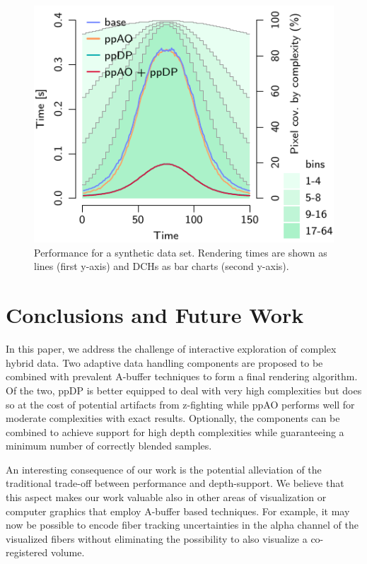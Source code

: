 \documentclass{egpubl}
\newcommand{\ab}{\mbox{A-buffer}}
\newcommand{\dch}{DCH}
\newcommand{\stencil}{ppAO}
\newcommand{\dloop}{ppDP}
\begin{document}
\begin{figure}[t]
\begin{minipage}{0.9\linewidth}
\begin{minipage}{1.0\linewidth}
    \includegraphics[width=\linewidth]{figures/plot-viewdep-quad-tall} 
  \end{minipage}
  \end{minipage}
  \caption{\label{fig:viewdep-quad}%
    Performance for a synthetic data set.
    Rendering times are shown as lines (first y-axis) and \dch{}s as bar charts (second y-axis). 
  }
\end{figure}


\section{Conclusions and Future Work}
\label{sec:conclusion}


In this paper, we address the challenge of interactive exploration of complex hybrid data. 
Two adaptive data handling components are proposed to be combined with prevalent \ab{} techniques to form a final rendering algorithm. 
Of the two, \dloop{} is better equipped to deal with very high complexities but does so at the cost of potential artifacts from z-fighting while \stencil{} performs well for moderate complexities with exact results. 
Optionally, the components can be combined to achieve support for high depth complexities while guaranteeing a minimum number of correctly blended samples. 

An interesting consequence of our work is the potential alleviation of the traditional trade-off between performance and depth-support. 
We believe that this aspect makes our work valuable also in other areas of visualization or computer graphics that employ \ab{} based techniques.
For example, it may now be possible to encode fiber tracking uncertainties in the alpha channel of the visualized fibers without eliminating the possibility to also visualize a co-registered volume. 
\end{document}
